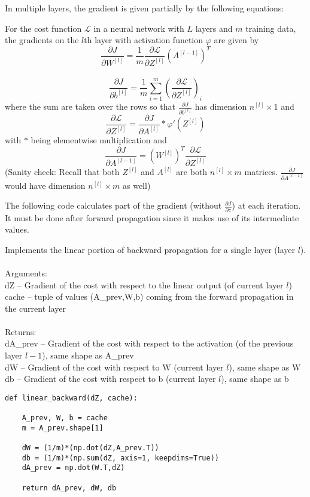\documentclass[a4paper]{article}
\begin{document}
In multiple layers, the gradient is given partially by the following equations: 

\begin{prp}{}{} For the cost function $\mathcal{L}$ in a neural network with $L$ layers and $m$ training data, the gradients on the $l$th layer with activation function $\varphi$ are given by $$\frac{\partial J}{\partial W^{[l]}}=\frac{1}{m}\frac{\partial\mathcal{L}}{\partial Z^{[l]}}\left(A^{[l-1]}\right)^T$$~$$\frac{\partial J}{\partial b^{[l]}}=\frac{1}{m}\sum_{i=1}^m\left(\frac{\partial\mathcal{L}}{\partial Z^{[l]}}\right)_i$$ where the sum are taken over the rows so that $\frac{\partial J}{\partial b^{[l]}}$ has dimension $n^{[l]}\times 1$ and $$\frac{\partial\mathcal{L}}{\partial Z^{[l]}}=\frac{\partial J}{\partial A^{[l]}}\ast\varphi'(Z^{[l]})$$ with $\ast$ being elementwise multiplication and $$\frac{\partial J}{\partial A^{[l-1]}}=(W^{[l]})^T\frac{\partial\mathcal{L}}{\partial Z^{[l]}}$$ (Sanity check: Recall that both $Z^{[l]}$ and $A^{[l]}$ are both $n^{[l]}\times m$ matrices. $\frac{\partial J}{\partial A^{[l-1]}}$ would have dimension $n^{[l]}\times m$ as well)
\end{prp}

The following code calculates part of the gradient (without $\frac{\partial J}{\partial z}$) at each iteration. It must be done after forward propagation since it makes use of its intermediate values. 

\begin{alg}{}{} Implements the linear portion of backward propagation for a single layer (layer $l$). \\~\\
Arguments: \\
dZ -- Gradient of the cost with respect to the linear output (of current layer $l$)\\
cache -- tuple of values (A\_prev,W,b) coming from the forward propagation in the current layer\\~\\
Returns: \\
dA\_prev -- Gradient of the cost with respect to the activation (of the previous layer $l-1$), same shape as A\_prev\\
dW -- Gradient of the cost with respect to W (current layer $l$), same shape as W\\
db -- Gradient of the cost with respect to b (current layer $l$), same shape as b\\
\begin{verbatim}
def linear_backward(dZ, cache):

    A_prev, W, b = cache
    m = A_prev.shape[1]

    dW = (1/m)*(np.dot(dZ,A_prev.T))
    db = (1/m)*(np.sum(dZ, axis=1, keepdims=True))
    dA_prev = np.dot(W.T,dZ)
    
    return dA_prev, dW, db
\end{verbatim}
\end{alg}
\end{document}
